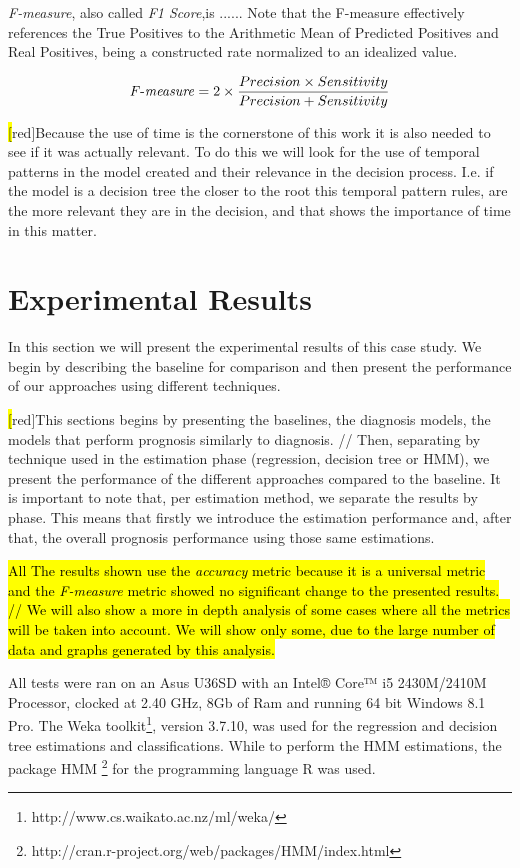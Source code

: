 \emph{F-measure}, also called \emph{F1 Score},is ...... Note that the F-measure effectively references the True Positives to the Arithmetic Mean of Predicted Positives and Real Positives, being a constructed rate normalized to an idealized value.

\begin{equation}
\mathit{F\textnormal{-}measure} = 2 \times \frac{ Precision \times Sensitivity}{Precision + Sensitivity}
\label{eq:fmeasure}
\end{equation}

\hl[red]{Because the use of time is the cornerstone of this work it is also needed to see if it was actually relevant. To do this we will look for the use of temporal patterns in the model created and their relevance in the decision process. I.e. if the model is a decision tree the closer to the root this temporal pattern rules, are the more relevant they are in the decision, and that shows the importance of time in this matter.}

\section{Experimental Results}
\label{section:results}

In this section we will present the experimental results of this case study. We begin by describing the baseline for comparison and then present the performance of our approaches using different techniques.

\hl[red]{This sections begins by presenting the baselines, the diagnosis models, the models that perform prognosis similarly to diagnosis. //
	Then, separating by technique used in the estimation phase (regression, decision tree or HMM), we present the performance of the different approaches compared to the baseline. It is important to note that, per estimation method, we separate the results by phase. This means that firstly we introduce the estimation performance and, after that, the overall prognosis performance using those same estimations. } 

\hl{All The results shown use the \emph{accuracy} metric because it is a universal metric and the \emph{F-measure} metric showed no significant change to the presented results. // We will also show a more in depth analysis of some cases where all the metrics will be taken into account. We will show only some, due to the large number of data and graphs generated by this analysis. }

All tests were ran on an Asus U36SD with an Intel® Core™ i5 2430M/2410M Processor, clocked at 2.40 GHz, 8Gb of Ram and running 64 bit Windows 8.1 Pro.
The Weka toolkit\footnote{http://www.cs.waikato.ac.nz/ml/weka/}, version 3.7.10, was used for the regression and decision tree estimations and classifications. While to perform the HMM estimations, the package HMM \footnote{http://cran.r-project.org/web/packages/HMM/index.html} for the programming language R was used.

